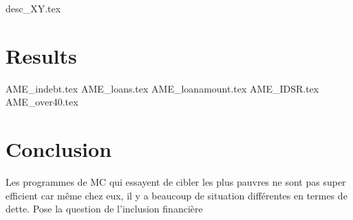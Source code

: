 \documentclass[a4paper, 11pt, onecolumn]{article}
\begin{document}
{desc_XY.tex}







\newpage
\section{Results}


{AME_indebt.tex}
{AME_loans.tex}
{AME_loanamount.tex}
{AME_IDSR.tex}
{AME_over40.tex}














\newpage
\section*{Conclusion}
\label{Conclusion}

Les programmes de MC qui essayent de cibler les plus pauvres ne sont pas super efficient car même chez eux, il y a beaucoup de situation différentes en termes de dette.
Pose la question de l'inclusion financière


\clearpage
\newpage

\end{document}
